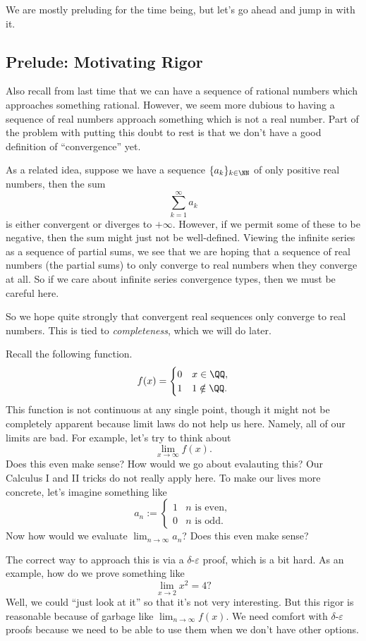 \documentclass[../notes.tex]{subfiles}
\begin{document}
We are mostly preluding for the time being, but let's go ahead and jump in with it.

\subsection{Prelude: Motivating Rigor}
Also recall from last time that we can have a sequence of rational numbers which approaches something rational. However, we seem more dubious to having a sequence of real numbers approach something which is not a real number. Part of the problem with putting this doubt to rest is that we don't have a good definition of ``convergence'' yet.

As a related idea, suppose we have a sequence $\{a_k\}_{k\in\NN}$ of only positive real numbers, then the sum
\[\sum_{k=1}^\infty a_k\]
is either convergent or diverges to $+\infty.$ However, if we permit some of these to be negative, then the sum might just not be well-defined. Viewing the infinite series as a sequence of partial sums, we see that we are hoping that a sequence of real numbers (the partial sums) to only converge to real numbers when they converge at all. So if we care about infinite series convergence types, then we must be careful here.

So we hope quite strongly that convergent real sequences only converge to real numbers. This is tied to \textit{completeness}, which we will do later.

Recall the following function.
\[f(x)=\begin{cases}
	0 & x\in\QQ, \\
	1 & 1\notin\QQ.
\end{cases}\]
This function is not continuous at any single point, though it might not be completely apparent because limit laws do not help us here. Namely, all of our limits are bad. For example, let's try to think about
\[\lim_{x\to\infty}f(x).\]
Does this even make sense? How would we go about evalauting this? Our Calculus I and II tricks do not really apply here. To make our lives more concrete, let's imagine something like
\[a_n:=\begin{cases}
	1 & n\text{ is even}, \\
	0 & n\text{ is odd}.
\end{cases}\]
Now how would we evaluate $\lim_{n\to\infty}a_n$? Does this even make sense?

The correct way to approach this is via a $\delta$-$\varepsilon$ proof, which is a bit hard. As an example, how do we prove something like
\[\lim_{x\to2}x^2=4?\]
Well, we could ``just look at it'' so that it's not very interesting. But this rigor is reasonable because of garbage like $\lim_{n\to\infty}f(x).$ We need comfort with $\delta$-$\varepsilon$ proofs because we need to be able to use them when we don't have other options.
\end{document}

